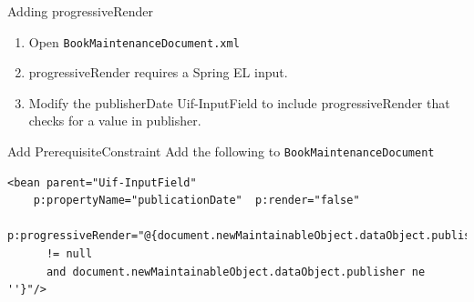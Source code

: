 \documentclass[xcolor=dvipsnames,14pt,professionalfonts]{beamer}
\begin{document}
\begin{frame}{Adding progressiveRender}
  \begin{enumerate}
    \item Open \texttt{BookMaintenanceDocument.xml}
    \item progressiveRender requires a Spring EL input.
    \item Modify the publisherDate Uif-InputField to include
      progressiveRender that checks for a value in publisher.
  \end{enumerate}
\end{frame}

\begin{frame}[fragile]{Add PrerequisiteConstraint}
Add the following to \texttt{BookMaintenanceDocument}
    \begin{verbatim}
<bean parent="Uif-InputField" 
    p:propertyName="publicationDate"  p:render="false"
	p:progressiveRender="@{document.newMaintainableObject.dataObject.publisher
      != null 
      and document.newMaintainableObject.dataObject.publisher ne ''}"/>
    \end{verbatim}
\end{frame}
\end{document}
